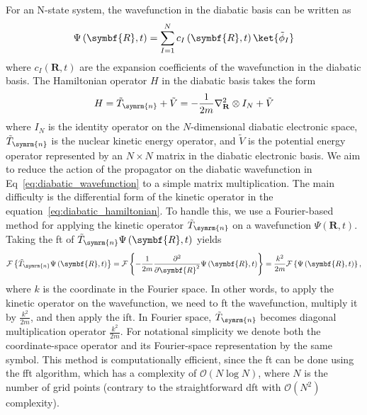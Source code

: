 For an N-state system, the wavefunction in the diabatic basis can be written as
\begin{equation}\label{eq:diabatic_wavefunction}
\Psi\left(\symbf{R},t\right)=\sum_{I=1}^N c_I\left(\symbf{R},t\right)\ket{\tilde\phi_I}
\end{equation}
where $c_I\left(\symbf{R},t\right)$ are the expansion coefficients of the wavefunction in the diabatic basis. The Hamiltonian operator $H$ in the diabatic basis takes the form
\begin{equation}\label{eq:diabatic_hamiltonian}
H=\tilde{T}_{\symrm{n}}+\tilde{V}=-\frac{1}{2m}\nabla_\mathbf{R}^2\otimes I_N+\tilde{V}
\end{equation}
where $I_N$ is the identity operator on the $N$-dimensional diabatic electronic space,
$\tilde{T}_{\symrm{n}}$ is the nuclear kinetic energy operator, and $\tilde{V}$ is the
potential energy operator represented by an $N\times N$ matrix in the diabatic electronic basis. We aim to reduce the action of the propagator on the diabatic wavefunction in Eq~\eqref{eq:diabatic_wavefunction} to a simple matrix multiplication. The main difficulty is the differential form of the kinetic operator in the equation~\eqref{eq:diabatic_hamiltonian}. To handle this, we use a Fourier-based method for applying the kinetic operator $\tilde{T}_{\symrm{n}}$ on a wavefunction $\Psi\left(\symbf{R},t\right)$. Taking the \acrfull{ft} of $\tilde{T}_{\symrm{n}}\Psi\left(\symbf{R},t\right)$ yields
\begin{equation}\label{eq:kinetic_fourier_method}
\mathcal{F}\left\lbrace \tilde{T}_{\symrm{n}}\Psi\left(\symbf{R},t\right)\right\rbrace=\mathcal{F}\left\lbrace-\frac{1}{2m}\frac{\partial^2}{\partial \symbf{R}^2}\Psi\left(\symbf{R},t\right)\right\rbrace=\frac{k^2}{2m}\mathcal{F}\left\lbrace\Psi\left(\symbf{R},t\right)\right\rbrace,
\end{equation}
where $k$ is the coordinate in the Fourier space. In other words, to apply the kinetic operator on the wavefunction, we need to \acrshort{ft} the wavefunction, multiply it by $\frac{k^2}{2m}$, and then apply the \acrfull{ift}. In Fourier space, $\tilde{T}_{\symrm{n}}$ becomes diagonal multiplication operator $\frac{k^2}{2m}$. For notational simplicity we denote both the coordinate-space operator and its Fourier-space representation by the same symbol. This method is computationally efficient, since the \acrshort{ft} can be done using the \acrfull{fft} algorithm, which has a complexity of $\mathcal{O}(N\log N)$, where $N$ is the number of grid points (contrary to the straightforward \acrfull{dft} with $\mathcal{O}(N^2)$ complexity).

